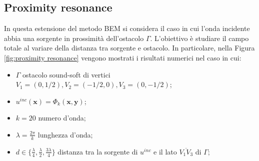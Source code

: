 \documentclass[a4paper,12pt]{article}
\theoremstyle{definition}
\begin{document}
\subsection{Proximity resonance}
\label{subsec:proximity resonance}
In questa estensione del metodo BEM si considera il caso in cui l'onda incidente abbia una sorgente in prossimità dell'ostacolo $\Gamma$. L'obiettivo è studiare il campo totale al variare della distanza tra sorgente e ostacolo. In particolare, nella Figura \ref{fig:proximity resonance} vengono mostrati i risultati numerici nel caso in cui:
\begin{itemize}
    \item $\Gamma$ ostacolo sound-soft di vertici $V_1 = (0, 1/2), V_2=(-1/2, 0), V_3=(0, -1/2)$;
    \item $u^{inc}(\textbf{x}) = \Phi_k(\textbf{x}, \textbf{y})$;
    \item $k=20$ numero d'onda;
    \item $\lambda= \frac{2\pi}{k}$ lunghezza d'onda; 
    \item $d \in \{\frac{\lambda}{4}, \frac{\lambda}{2}, \frac{3\lambda}{4}\}$ distanza tra la sorgente di $u^{inc}$ e il lato $\overline{V_1 V_3}$ di $\Gamma$; 
\end{itemize}
\end{document}

